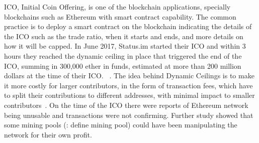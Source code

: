 ICO, Initial Coin Offering, is one of the blockchain applications, specially blockchains such as Ethereum with smart contract capability. The common practice is to deploy a smart contract on the blockchain indicating the details of the ICO such as the trade ratio, when it starts and ends, and more details on how it will be capped.
In June 2017, Status.im started their ICO and within 3 hours they reached the dynamic ceiling in place that triggered the end of the ICO, summing in 300,000 ether in funds, estimated at more than 200 million dollars at the time of their ICO. ~\cite{statusicoanalysis}. The idea behind Dynamic Ceilings is to make it more costly for larger contributors,  in the form of transaction fees, which have to split their contributions to different addresses, with minimal impact to smaller contributors~\cite{statuswhitepaper}.
On the time of the ICO there were reports of Ethereum network being unusable and transactions were not confirming. Further study showed that some mining pools (\todo: define mining pool) could have been manipulating the network for their own profit.





